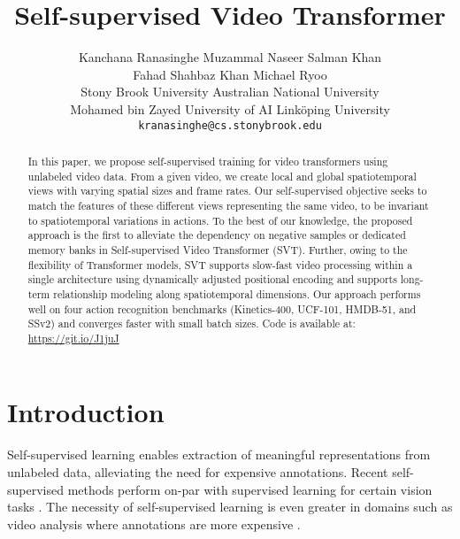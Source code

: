\documentclass[10pt,twocolumn,letterpaper]{article}
\begin{document}
\title{Self-supervised Video Transformer}

\author{Kanchana Ranasinghe \quad 
  Muzammal Naseer \quad 
  Salman Khan \\
  Fahad Shahbaz Khan \quad
  Michael Ryoo
  \vspace{0.5em} \\
  Stony Brook University \quad 
  Australian National University \\ 
  Mohamed bin Zayed University of AI \quad 
  Link\"{o}ping University 
\vspace{0.1em} \\
  \small{\texttt{kranasinghe@cs.stonybrook.edu}}
}




\maketitle

\begin{abstract}


In this paper, we propose self-supervised training for video transformers using unlabeled video data. 
From a given video, we create local and global spatiotemporal views with varying spatial sizes and frame rates.
Our self-supervised objective seeks to match the features of these different views representing the same video, to be invariant to spatiotemporal variations in actions. 
To the best of our knowledge, the proposed approach is the first to alleviate the dependency on negative samples or dedicated memory banks in Self-supervised Video Transformer (SVT).
Further, owing to the flexibility of Transformer models, SVT supports slow-fast video processing within a single architecture using dynamically adjusted positional encoding and supports long-term relationship modeling along spatiotemporal dimensions. 
Our approach performs well on four action recognition benchmarks (Kinetics-400, UCF-101, HMDB-51, and SSv2) and converges faster with small batch sizes. Code is available at: \url{https://git.io/J1juJ}



\end{abstract}
 

\section{Introduction}
\label{sec:intro}

Self-supervised learning  enables extraction of meaningful representations from unlabeled data, alleviating the need for expensive annotations. Recent self-supervised methods perform on-par with supervised learning for certain vision tasks \cite{he2020momentum, chen2020simple, caron2018DeepCF, caron2020unsupervised}. The necessity of self-supervised learning is even greater in domains such as video analysis where annotations are more expensive \cite{piergiovanni2020evolving, recasens2021broaden, Jenni_2021_ICCV, Huang_2021_ICCV}. 
\end{document}
